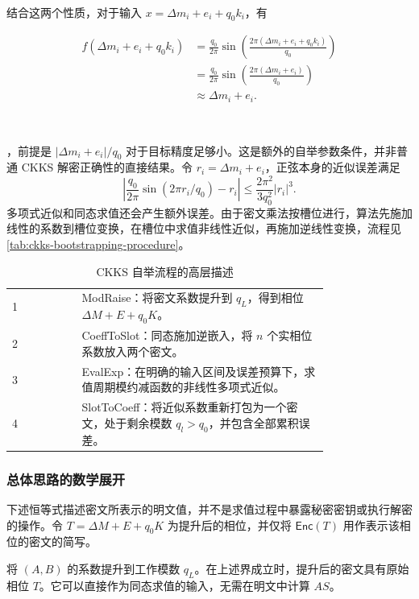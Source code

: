 $ $

结合这两个性质，对于输入 $x = \Delta m_i + e_i + q_0k_i$，有

\[
\begin{aligned}
f(\Delta m_i+e_i+q_0k_i)
&=\frac{q_0}{2\pi}\sin\left(\frac{2\pi(\Delta m_i+e_i+q_0k_i)}{q_0}\right)\\
&=\frac{q_0}{2\pi}\sin\left(\frac{2\pi(\Delta m_i+e_i)}{q_0}\right)\\
&\approx\Delta m_i+e_i.
\end{aligned}
\]

$ $

，前提是 $|\Delta m_i+e_i|/q_0$ 对于目标精度足够小。这是额外的自举参数条件，并非普通 CKKS 解密正确性的直接结果。令 $r_i=\Delta m_i+e_i$，正弦本身的近似误差满足
\[
\left|\frac{q_0}{2\pi}\sin(2\pi r_i/q_0)-r_i\right|
\leq\frac{2\pi^2}{3q_0^2}|r_i|^3.
\]
多项式近似和同态求值还会产生额外误差。由于密文乘法按槽位进行，算法先施加线性的系数到槽位变换，在槽位中求值非线性近似，再施加逆线性变换，流程见 \autoref{tab:ckks-bootstrapping-procedure}。

\begin{table}
\begin{tabular}{|lp{0.78\linewidth}|}
\hline
1 & \textsf{ModRaise}：将密文系数提升到 $q_L$，得到相位 $\Delta M+E+q_0K$。\\
2 & \textsf{CoeffToSlot}：同态施加逆嵌入，将 $n$ 个实相位系数放入两个密文。\\
3 & \textsf{EvalExp}：在明确的输入区间及误差预算下，求值周期模约减函数的非线性多项式近似。\\
4 & \textsf{SlotToCoeff}：将近似系数重新打包为一个密文，处于剩余模数 $q_l>q_0$，并包含全部累积误差。\\
\hline
\end{tabular}
\caption{CKKS 自举流程的高层描述}
\label{tab:ckks-bootstrapping-procedure}
\end{table}

\subsubsection{总体思路的数学展开}
\label{subsubsec:ckks-bootstrapping-high-level-correctness}

下述恒等式描述密文所表示的明文值，并不是求值过程中暴露秘密密钥或执行解密的操作。令 $T=\Delta M+E+q_0K$ 为提升后的相位，并仅将 $\mathsf{Enc}(T)$ 用作表示该相位的密文的简写。

 将 $(A,B)$ 的系数提升到工作模数 $q_L$。在上述界成立时，提升后的密文具有原始相位 $T$。它可以直接作为同态求值的输入，无需在明文中计算 $AS$。

